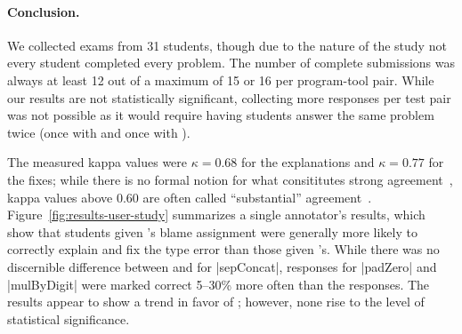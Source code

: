 \paragraph{Conclusion.}
%
We collected exams from 31 students, though due to the nature of the
study not every student completed every problem.
%
The number of complete submissions was always at least 12 out of
a maximum of 15 or 16 per program-tool pair.
%
While our results are not statistically significant,
collecting more responses per test pair was not possible as it
would require having students answer the same problem twice (once with
\sherrloc and once with \toolname).




%
The measured kappa values were $\kappa = 0.68$ for the explanations and
$\kappa = 0.77$ for the fixes; while there is no formal notion for what
consititutes strong agreement~\cite{Krippendorff2012-wd}, kappa values
above $0.60$ are often called ``substantial''
agreement~\cite{Landis1977-ey}.
%
Figure~\ref{fig:results-user-study} summarizes a single annotator's
results, which show that students given \toolname's blame assignment
were generally more likely to correctly explain and fix the type error
than those given \sherrloc's.
%
While there was no discernible difference between \toolname and
\sherrloc for |sepConcat|, \toolname responses for |padZero| and
|mulByDigit| were marked correct 5--30\% more often than the \sherrloc
responses.
%
The results appear to show a trend in favor of \toolname;
%
however, none rise to the level of statistical significance.
%
